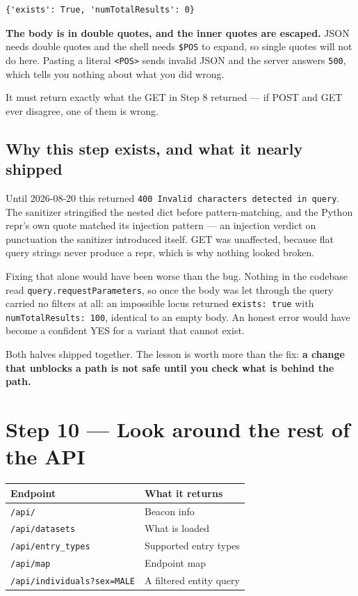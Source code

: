 \documentclass[
  10pt,
]{article}
\newcounter{none} %
\begin{document}
\begin{verbatim}
{'exists': True, 'numTotalResults': 0}
\end{verbatim}

\textbf{The body is in double quotes, and the inner quotes are escaped.}
JSON needs double quotes and the shell needs \texttt{\$POS} to expand,
so single quotes will not do here. Pasting a literal
\texttt{\textless{}POS\textgreater{}} sends invalid JSON and the server
answers \texttt{500}, which tells you nothing about what you did wrong.

It must return exactly what the GET in Step 8 returned --- if POST and
GET ever disagree, one of them is wrong.

\subsection{Why this step exists, and what it nearly
shipped}\label{why-this-step-exists-and-what-it-nearly-shipped}

Until 2026-08-20 this returned
\texttt{400\ Invalid\ characters\ detected\ in\ query}. The sanitizer
stringified the nested dict before pattern-matching, and the Python
repr's own quote matched its injection pattern --- an injection verdict
on punctuation the sanitizer introduced itself. GET was unaffected,
because flat query strings never produce a repr, which is why nothing
looked broken.

Fixing that alone would have been worse than the bug. Nothing in the
codebase read \texttt{query.requestParameters}, so once the body was let
through the query carried no filters at all: an impossible locus
returned \texttt{exists:\ true} with \texttt{numTotalResults:\ 100},
identical to an empty body. An honest error would have become a
confident YES for a variant that cannot exist.

Both halves shipped together. The lesson is worth more than the fix:
\textbf{a change that unblocks a path is not safe until you check what
is behind the path.}

\section{Step 10 --- Look around the rest of the
API}\label{step-10-look-around-the-rest-of-the-api}

{\def\LTcaptype{none} %
\begin{longtable}[]{@{}ll@{}}
\toprule\noalign{}
Endpoint & What it returns \\
\midrule\noalign{}
\endhead
\bottomrule\noalign{}
\endlastfoot
\texttt{/api/} & Beacon info \\
\texttt{/api/datasets} & What is loaded \\
\texttt{/api/entry\_types} & Supported entry types \\
\texttt{/api/map} & Endpoint map \\
\texttt{/api/individuals?sex=MALE} & A filtered entity query \\
\end{longtable}
}
\end{document}
